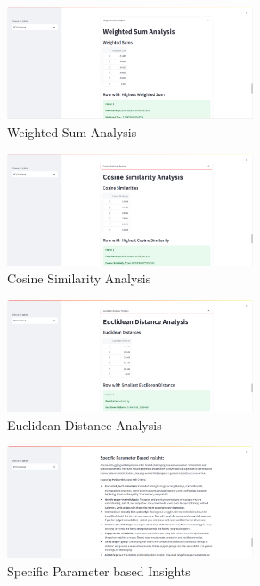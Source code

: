 \begin{figure}[h!]  
    \centering
    \includegraphics[width=0.65\textwidth]{App Images/22 Interface.png}  
    \caption{Weighted Sum Analysis}
    \label{10i23445}  %
\end{figure} 


\begin{figure}[h!]  
    \centering
    \includegraphics[width=0.65\textwidth]{App Images/23 Interface.png}  
    \caption{Cosine Similarity Analysis}
    \label{10i23445}  %
\end{figure} 

\begin{figure}[h!]  
    \centering
    \includegraphics[width=0.65\textwidth]{App Images/24 Interface.png}  
    \caption{Euclidean Distance Analysis}
    \label{10i23445}  %
\end{figure} 

\begin{figure}[h!]  
    \centering
    \includegraphics[width=0.65\textwidth]{App Images/25 Interface.png}  
    \caption{Specific Parameter based Insights}
    \label{10i23445}  %
\end{figure} 

